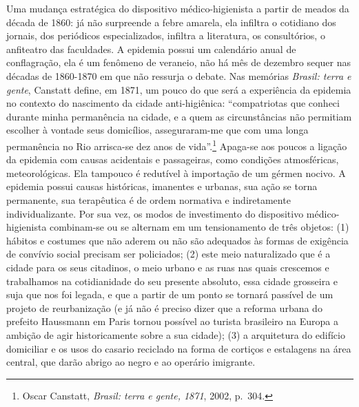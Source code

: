 Uma mudança estratégica do dispositivo médico-higienista a partir de
meados da década de 1860: já não surpreende a febre amarela, ela
infiltra o cotidiano dos jornais, dos periódicos especializados,
infiltra a literatura, os consultórios, o anfiteatro das faculdades. A
epidemia possui um calendário anual de conflagração, ela é um fenômeno
de veraneio, não há mês de dezembro sequer nas décadas de 1860-1870 em
que não ressurja o debate. Nas memórias \emph{Brasil: terra e gente},
Canstatt define, em 1871, um pouco do que será a experiência da epidemia
no contexto do nascimento da cidade anti-higiênica: ``compatriotas que
conheci durante minha permanência na cidade, e a quem as circunstâncias
não permitiam escolher à vontade seus domicílios, asseguraram-me que com
uma longa permanência no Rio arrisca-se dez anos de vida''.\footnote{Oscar
  Canstatt, \emph{Brasil: terra e gente, 1871}, 2002, p.~304.} Apaga-se
aos poucos a ligação da epidemia com causas acidentais e passageiras,
como condições atmosféricas, meteorológicas. Ela tampouco é redutível à
importação de um gérmen nocivo. A epidemia possui causas históricas,
imanentes e urbanas, sua ação se torna permanente, sua terapêutica é de
ordem normativa e indiretamente individualizante. Por sua vez, os modos
de investimento do dispositivo médico-higienista combinam-se ou se
alternam em um tensionamento de três objetos: (1) hábitos e costumes que
não aderem ou não são adequados às formas de exigência de convívio
social precisam ser policiados; (2) este meio naturalizado que é a
cidade para os seus citadinos, o meio urbano e as ruas nas quais
crescemos e trabalhamos na cotidianidade do seu presente absoluto, essa
cidade grosseira e suja que nos foi legada, e que a partir de um ponto
se tornará passível de um projeto de reurbanização (e já não é preciso
dizer que a reforma urbana do prefeito Haussmann em Paris tornou
possível ao turista brasileiro na Europa a ambição de agir
historicamente sobre a sua cidade); (3) a arquitetura do edifício
domiciliar e os usos do casario reciclado na forma de cortiços e
estalagens na área central, que darão abrigo ao negro e ao operário
imigrante.

